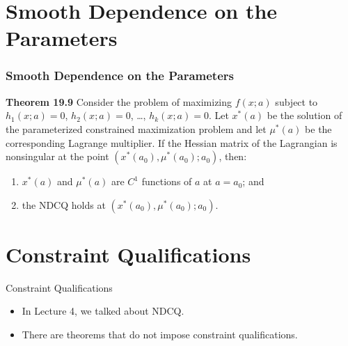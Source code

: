 \documentclass[9pt,aspectratio=169]{beamer}
\begin{document}
\section{Smooth Dependence on the Parameters}

\begin{frame}
    \frametitle{Smooth Dependence on the Parameters}
    \begin{block}{\bfseries Theorem 19.9}
        Consider the problem of maximizing $f(x; a)$ subject to $h_1(x; a)=0$,
        $h_2(x; a)=0$, \ldots, $h_k(x; a)=0$. Let $x^*(a)$ be the solution of the
        parameterized constrained maximization problem and let $\mu^*(a)$ be
        the corresponding Lagrange multiplier. If the Hessian matrix of the
        Lagrangian is nonsingular at the point $(x^*(a_0), \mu^*(a_0); a_0)$,
        then:
        \begin{enumerate}
            \item $x^*(a)$ and $\mu^*(a)$ are $C^1$ functions of $a$ at $a =
            a_0$; and
            \item the NDCQ holds at $(x^*(a_0), \mu^*(a_0); a_0)$.
        \end{enumerate}
    \end{block}
\end{frame}

\section{Constraint Qualifications}

\begin{frame}{Constraint Qualifications}
    \begin{itemize}
        \item In Lecture 4, we talked about NDCQ.
        \item There are theorems that do not impose constraint qualifications.
    \end{itemize}
\end{frame}
\end{document}
